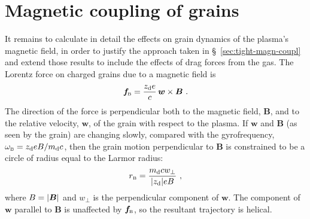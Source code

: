 \section{Magnetic coupling of grains}
\label{sec:magn-effects-grain}


It remains to calculate in detail the effects on grain dynamics of the
plasma's magnetic field, in order to justify the approach taken in
\S~\ref{sec:tight-magn-coupl} and extend those results to include the
effects of drag forces from the gas.  The Lorentz force on charged
grains due to a magnetic field is
\begin{equation}
  \label{eq:f-lorentz}
  \bm{f}\!_{\scriptscriptstyle\text{B}} = \frac{z_{\text{d}} e}{c} \, \bm{w} \times \bm{B} \ . 
\end{equation}
The direction of the force is perpendicular both to the magnetic
field, \(\bm{B}\), and to the relative velocity, \(\bm{w}\), of the
grain with respect to the plasma.  If \(\bm{w}\) and \(\bm{B}\) (as
seen by the grain) are changing slowly, compared with the
gyrofrequency, \(\omega_{\scriptscriptstyle\text{B}} = z_{\text{d}} e B / m_{\text{d}} c\), then the grain
motion perpendicular to \(\bm{B}\) is constrained to be a circle of
radius equal to the Larmor radius:
\begin{equation}
  \label{eq:Larmor}
  r_{\scriptscriptstyle\text{B}} = \frac{m_{\text{d}} c w_\perp} {\lvert z_{\text{d}}\rvert e B} \ ,
\end{equation}
where \(B = \lvert\bm{B}\rvert\) and \(w_\perp\) is the perpendicular component
of \(\bm{w}\).  The component of \(\bm{w}\) parallel to \(\bm{B}\) is
unaffected by \(\bm{f}\!_{\scriptscriptstyle\text{B}}\), so the resultant trajectory is helical.

